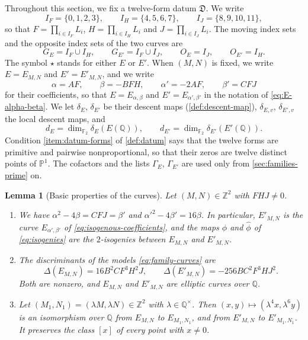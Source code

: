 \documentclass[12pt,oneside,openany]{book}
\theoremstyle{definition}
\theoremstyle{plain}
\numberwithin{equation}{chapter}
\theoremstyle{plain}
\newtheorem{lemma}[lemma]{Lemma}
\theoremstyle{definition}
\theoremstyle{remark}
\newcommand{\Q}{\mathbb Q}
\newcommand{\Z}{\mathbb Z}
\newcommand{\F}{\mathbb F}
\newcommand{\sq}[1]{[#1]}
\newcommand{\dual}{\hat\phi}
\newcommand{\datum}{\mathfrak D}
\begin{document}
Throughout this section, we fix a twelve-form datum $\datum$. We write
\begin{equation}\label{eq:index-sets}
I_F=\{0,1,2,3\},\qquad I_H=\{4,5,6,7\},\qquad I_J=\{8,9,10,11\},
\end{equation}
so that $F=\prod_{i\in I_F}L_i$, $H=\prod_{i\in I_H}L_i$ and $J=\prod_{i\in I_J}L_i$. The moving index sets and the opposite index sets of the two curves are
\begin{equation}\label{eq:moving-sets}
G_E=I_F\cup I_H,\qquad G_{E'}=I_F\cup I_J,\qquad O_E=I_J,\qquad O_{E'}=I_H.
\end{equation}
The symbol $\star$ stands for either $E$ or $E'$. When $(M,N)$ is fixed, we write $E=E_{M,N}$ and $E'=E'_{M,N}$, and we write
\begin{equation}\label{eq:family-coefficients}
\alpha=AF,\qquad\beta=-BFH,\qquad\alpha'=-2AF,\qquad\beta'=CFJ
\end{equation}
for their coefficients, so that $E=E_{\alpha,\beta}$ and $E'=E_{\alpha',\beta'}$ in the notation of \eqref{eq:E-alpha-beta}. We let $\delta_E$, $\delta_{E'}$ be their descent maps (\cref{def:descent-map}), $\delta_{E,v}$, $\delta_{E',v}$ the local descent maps, and
\begin{equation}\label{eq:dE-dEprime}
d_E=\dim_{\F_2}\delta_E(E(\Q)),\qquad d_{E'}=\dim_{\F_2}\delta_{E'}(E'(\Q)).
\end{equation}
Condition \ref{item:datum-forms} of \cref{def:datum} says that the twelve forms are primitive and pairwise nonproportional, so that their zeros are twelve distinct points of $\mathbb P^1$. The cofactors and the lists $\Gamma_E$, $\Gamma_{E'}$ are used only from \cref{sec:families-prime} on.

\begin{lemma}[Basic properties of the curves]\label{lem:datum-basic}
Let $(M,N)\in\Z^2$ with $FHJ\ne0$.
\begin{enumerate}[label=(\alph*),ref=(\alph*)]
\item\label{item:datum-basic-dual} We have $\alpha^2-4\beta=CFJ=\beta'$ and $\alpha'^2-4\beta'=16\beta$. In particular, $E'_{M,N}$ is the curve $E_{\alpha',\beta'}$ of \eqref{eq:isogenous-coefficients}, and the maps $\phi$ and $\dual$ of \eqref{eq:isogenies} are the $2$-isogenies between $E_{M,N}$ and $E'_{M,N}$.
\item\label{item:datum-basic-disc} The discriminants of the models \eqref{eq:family-curves} are
\begin{equation}\label{eq:family-discriminants}
\Delta(E_{M,N})=16B^2CF^3H^2J,\qquad\Delta(E'_{M,N})=-256BC^2F^3HJ^2.
\end{equation}
Both are nonzero, and $E_{M,N}$ and $E'_{M,N}$ are elliptic curves over $\Q$.
\item\label{item:datum-basic-scaling} Let $(M_1,N_1)=(\lambda M,\lambda N)\in\Z^2$ with $\lambda\in\Q^\times$. Then $(x,y)\mapsto(\lambda^4x,\lambda^6y)$ is an isomorphism over $\Q$ from $E_{M,N}$ to $E_{M_1,N_1}$, and from $E'_{M,N}$ to $E'_{M_1,N_1}$. It preserves the class $\sq x$ of every point with $x\ne0$.
\end{enumerate}
\end{lemma}
\end{document}

